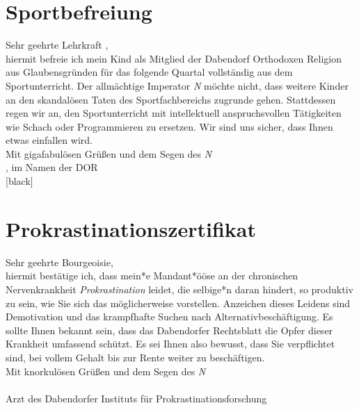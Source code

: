 \pagestyle{empty}
\section*{Sportbefreiung}
Sehr geehrte Lehrkraft \underline{\hspace{3.5cm}},\\[0.5cm]
hiermit befreie ich mein Kind \underline{\hspace{5cm}} als Mitglied der Dabendorf Orthodoxen Religion aus Glaubensgründen für das folgende Quartal vollständig aus dem Sportunterricht. Der allmächtige Imperator \textit{N} möchte nicht, dass weitere Kinder an den skandalösen Taten des Sportfachbereichs zugrunde gehen. Stattdessen regen wir an, den Sportunterricht mit intellektuell anspruchsvollen Tätigkeiten wie Schach oder Programmieren zu ersetzen. Wir sind uns sicher, dass Ihnen etwas einfallen wird.\\[0.5cm]
Mit gigafabulösen Grüßen und dem Segen des \textit{N}\\
\underline{\hspace{5cm}}, im Namen der DOR\\[1pt]

\noindent\Rightscissors\xdotfill{1pt}[black]

\section*{Prokrastinationszertifikat}
Sehr geehrte Bourgeoisie,\\[0.5cm]
hiermit bestätige ich, dass mein*e Mandant*ööse \underline{\hspace{5cm}} an der chronischen Nervenkrankheit \textit{Prokrastination} leidet, die selbige*n daran hindert, so produktiv zu sein, wie Sie sich das möglicherweise vorstellen. Anzeichen dieses Leidens sind Demotivation und das krampfhafte Suchen nach Alternativbeschäftigung. Es sollte Ihnen bekannt sein, dass das Dabendorfer Rechtsblatt die Opfer dieser Krankheit umfassend schützt. Es sei Ihnen also bewusst, dass Sie verpflichtet sind, \underline{\hspace{5.5cm}} bei vollem Gehalt bis zur Rente weiter zu beschäftigen.\\[0.5cm]
Mit knorkulösen Grüßen und dem Segen des \textit{N}\\
\underline{\hspace{5cm}}\\
Arzt des Dabendorfer Instituts für Prokrastinationsforschung\\[1pt]

